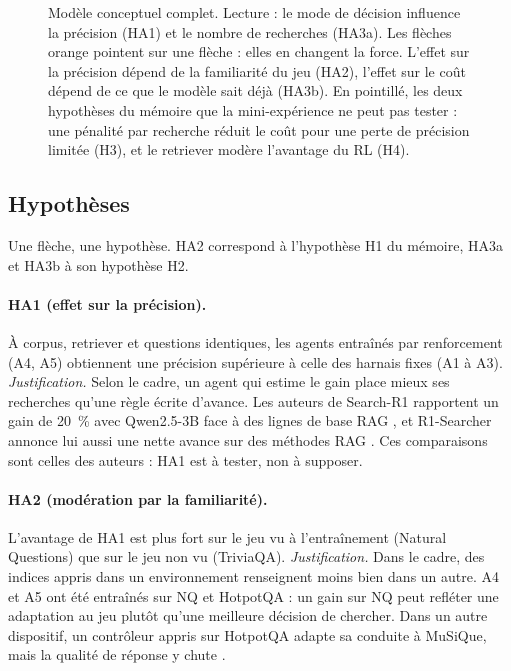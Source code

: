 \documentclass[11pt,a4paper]{article}
\begin{document}
\begin{figure}[ht]
\caption{Modèle conceptuel complet. Lecture : le mode de décision influence la précision (HA1) et le nombre de recherches (HA3a). Les flèches orange pointent sur une flèche : elles en changent la force. L'effet sur la précision dépend de la familiarité du jeu (HA2), l'effet sur le coût dépend de ce que le modèle sait déjà (HA3b). En pointillé, les deux hypothèses du mémoire que la mini-expérience ne peut pas tester : une pénalité par recherche réduit le coût pour une perte de précision limitée (H3), et le retriever modère l'avantage du RL (H4).}
\label{fig:modele}
\end{figure}

\subsection{Hypothèses}
Une flèche, une hypothèse. HA2 correspond à l'hypothèse H1 du mémoire, HA3a et HA3b à son hypothèse H2.

\paragraph{HA1 (effet sur la précision).} À corpus, retriever et questions identiques, les agents entraînés par renforcement (A4, A5) obtiennent une précision supérieure à celle des harnais fixes (A1 à A3).
\emph{Justification.} Selon le cadre, un agent qui estime le gain place mieux ses recherches qu'une règle écrite d'avance. Les auteurs de Search-R1 rapportent un gain de 20~\% avec Qwen2.5-3B face à des lignes de base RAG \citep{jin2025search}, et R1-Searcher annonce lui aussi une nette avance sur des méthodes RAG \citep{song2025r1}. Ces comparaisons sont celles des auteurs : HA1 est à tester, non à supposer.

\paragraph{HA2 (modération par la familiarité).} L'avantage de HA1 est plus fort sur le jeu vu à l'entraînement (Natural Questions) que sur le jeu non vu (TriviaQA).
\emph{Justification.} Dans le cadre, des indices appris dans un environnement renseignent moins bien dans un autre. A4 et A5 ont été entraînés sur NQ et HotpotQA : un gain sur NQ peut refléter une adaptation au jeu plutôt qu'une meilleure décision de chercher. Dans un autre dispositif, un contrôleur appris sur HotpotQA adapte sa conduite à MuSiQue, mais la qualité de réponse y chute \citep{raikote2026policy}.
\end{document}

